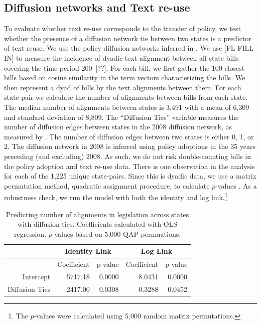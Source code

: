 \documentclass[12pt]{article} %
\providecommand{\DIFaddend}{} %
\begin{document}
\DIFaddend \subsection{Diffusion networks and Text re-use}

To evaluate whether text re-use corresponds to the transfer of policy, we test whether the presence of a diffusion network tie between two states is a predictor of text reuse. We use the policy diffusion networks inferred in \citet{desmarais2015}. We use [FL FILL IN] to measure the incidence of dyadic text alignment between all state bills covering the time period 200--[??]. For each bill, we first gather the 100 closest bills based on cosine similarity in the term vectors characterizing the bills. We then represent a dyad of bills by the text alignments between them. For each state-pair we calculate the number of alignments between bills from each state. The median number of alignments between states is 3,491 with a mean of 6,309 and standard deviation of 8,809. The ``Diffusion Ties'' variable measures the number of diffusion edges between states in the 2008 diffusion network, as measured by \citet{desmarais2015}. The number of diffusion edges between two states is either 0, 1, or 2. The diffusion network in 2008 is inferred using policy adoptions in the 35 years preceding (and excluding) 2008. As such, we do not risk double-counting bills in the policy adoption and text re-use data. There is one observation in the analysis for each of the 1,225 unique state-pairs. Since this is dyadic data, we use a matrix permutation method, quadratic assignment procedure, to calculate $p$-values \citep{krackhardt1988}. As a robustness check, we run the model with both the identity and log link.\footnote{The $p$-values were calculated using 5,000 random matrix permutations.}

\begin{table}[ht]
\centering
\begin{tabular}{rrrrr}
\hline
& \multicolumn{2}{c}{Identity Link} & \multicolumn{2}{c}{Log Link} \\
  \hline
 & Coefficient & p-value & Coefficient & p-value \\ 
  \hline
Intercept & 5717.18 & 0.0000 & 8.0431 & 0.0000 \\ 
  Diffusion Ties & 2417.00 & 0.0308 & 0.3288 & 0.0452 \\ 
   \hline
\end{tabular}
\caption{Predicting number of alignments in legislation across states with diffusion ties. Coefficients calculated with OLS regression. $p$-values based on 5,000 QAP permuations.}
\label{tab:qap.diffusion}
\end{table}
\end{document}
